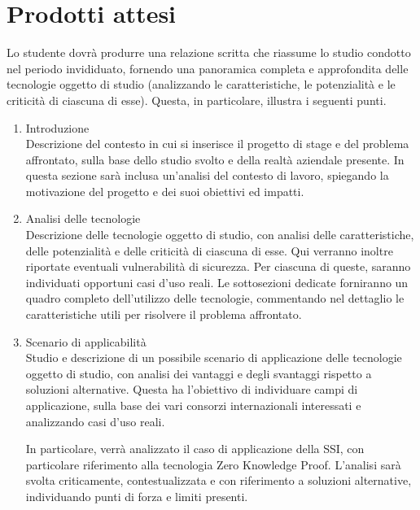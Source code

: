 \section*{Prodotti attesi}
Lo studente dovrà produrre una relazione scritta che riassume lo studio condotto nel periodo invididuato,
fornendo una panoramica completa e approfondita delle tecnologie oggetto di studio (analizzando le caratteristiche, le potenzialità e le criticità di ciascuna di esse).
Questa, in particolare, illustra i seguenti punti.
\begin{enumerate}
    \item Introduzione \\
    Descrizione del contesto in cui si inserisce il progetto di stage e del problema affrontato, sulla base dello studio svolto e della realtà aziendale presente.
    In questa sezione sarà inclusa un'analisi del contesto di lavoro, spiegando la motivazione del progetto e dei suoi obiettivi ed impatti.

    \item Analisi delle tecnologie \\
    Descrizione delle tecnologie oggetto di studio, con analisi delle caratteristiche, delle potenzialità e delle criticità di ciascuna di esse. Qui verranno inoltre riportate eventuali vulnerabilità di sicurezza. 
    Per ciascuna di queste, saranno individuati opportuni casi d'uso reali. Le sottosezioni dedicate forniranno un quadro completo dell'utilizzo delle tecnologie, commentando nel dettaglio le caratteristiche utili 
    per risolvere il problema affrontato.

    \newpage

    \item Scenario di applicabilità \\
    Studio e descrizione di un possibile scenario di applicazione delle tecnologie oggetto di studio, con analisi dei vantaggi e degli svantaggi rispetto a soluzioni alternative.
    Questa ha l'obiettivo di individuare campi di applicazione, sulla base dei vari consorzi internazionali interessati e analizzando casi d'uso reali. 

    \medskip
    
    In particolare, verrà analizzato il caso di applicazione della SSI, con particolare riferimento alla tecnologia Zero Knowledge Proof.
    L'analisi sarà svolta criticamente, contestualizzata e con riferimento a soluzioni alternative, individuando punti di forza e limiti presenti.
    


\end{enumerate}
